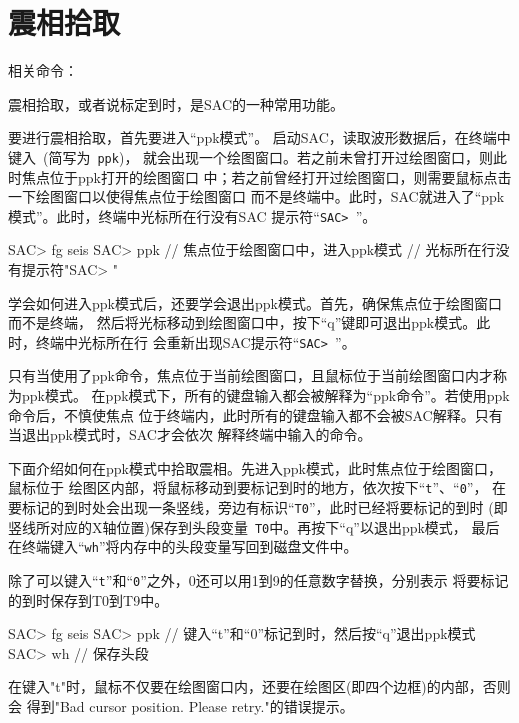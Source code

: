 \section{震相拾取}
\label{sec:phase-picking}
相关命令：

震相拾取，或者说标定到时，是SAC的一种常用功能。

要进行震相拾取，首先要进入``ppk模式''。
启动SAC，读取波形数据后，在终端中键入~(简写为~\verb+ppk+)，
就会出现一个绘图窗口。若之前未曾打开过绘图窗口，则此时焦点位于ppk打开的绘图窗口
中；若之前曾经打开过绘图窗口，则需要鼠标点击一下绘图窗口以使得焦点位于绘图窗口
而不是终端中。此时，SAC就进入了``ppk模式''。此时，终端中光标所在行没有SAC
提示符``\verb+SAC> +''。

\begin{SACCode}
SAC> fg seis
SAC> ppk    // 焦点位于绘图窗口中，进入ppk模式
            // 光标所在行没有提示符"SAC> "
\end{SACCode}

学会如何进入ppk模式后，还要学会退出ppk模式。首先，确保焦点位于绘图窗口而不是终端，
然后将光标移动到绘图窗口中，按下``q''键即可退出ppk模式。此时，终端中光标所在行
会重新出现SAC提示符``\verb+SAC> +''。

只有当使用了ppk命令，焦点位于当前绘图窗口，且鼠标位于当前绘图窗口内才称为ppk模式。
在ppk模式下，所有的键盘输入都会被解释为``ppk命令''。若使用ppk命令后，不慎使焦点
位于终端内，此时所有的键盘输入都不会被SAC解释。只有当退出ppk模式时，SAC才会依次
解释终端中输入的命令。

下面介绍如何在ppk模式中拾取震相。先进入ppk模式，此时焦点位于绘图窗口，鼠标位于
绘图区内部，将鼠标移动到要标记到时的地方，依次按下``\verb+t+''、``\verb+0+''，
在要标记的到时处会出现一条竖线，旁边有标识``\verb+T0+''，此时已经将要标记的到时
(即竖线所对应的X轴位置)保存到头段变量~\verb+T0+中。再按下``q''以退出ppk模式，
最后在终端键入``\verb+wh+''将内存中的头段变量写回到磁盘文件中。

除了可以键入``\verb+t+''和``\verb+0+''之外，0还可以用1到9的任意数字替换，分别表示
将要标记的到时保存到T0到T9中。

\begin{SACCode}
SAC> fg seis
SAC> ppk
// 键入``t''和``0''标记到时，然后按``q''退出ppk模式
SAC> wh         // 保存头段
\end{SACCode}

\begin{note}
在键入"t"时，鼠标不仅要在绘图窗口内，还要在绘图区(即四个边框)的内部，否则会
得到"Bad cursor position. Please retry."的错误提示。
\end{note}

